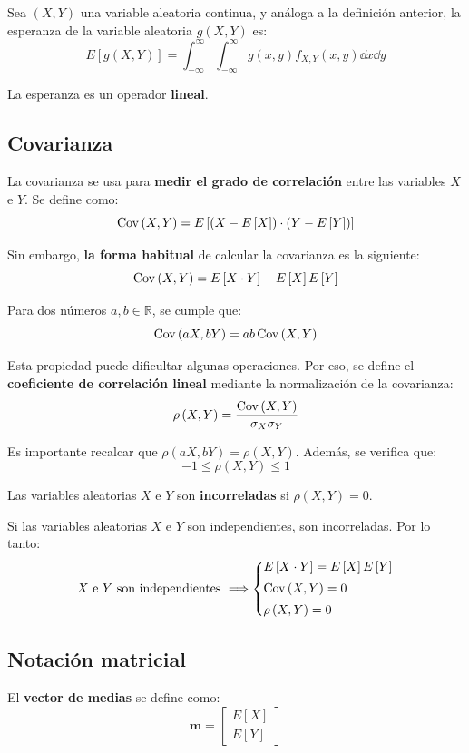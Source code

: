 \documentclass[a4paper]{book}
\renewcommand{\vec}[1]{\mathbf{#1}} %
\begin{document}
Sea $\left(X,Y\right)$ una variable aleatoria continua, y análoga a la definición anterior, la esperanza de la variable aleatoria $g\left(X,Y\right)$ es:
\[E\left[g\left(X,Y\right)\right] = \int_{-\infty}^{\infty}\int_{-\infty}^{\infty}g\left(x,y\right)f_{X,Y}(x,y)\dd{x} \dd{y}\]

La esperanza es un operador \textbf{lineal}.

\subsection{Covarianza}

La covarianza se usa para \textbf{medir el grado de correlación} entre las variables $X$ e $Y$. Se define como:
\[\operatorname{Cov} \left( X,Y \right) = E \left[\left(X-E\left[X\right]\right) \cdot \left(Y - E\left[Y\right]\right)\right]\]

Sin embargo, \textbf{la forma habitual} de calcular la covarianza es la siguiente:
\[\operatorname{Cov} \left( X,Y \right) = E\left[X\cdot Y\right] - E\left[X\right]E\left[Y\right]\]

Para dos números $a,b \in \mathbb{R}$, se cumple que:
\[\operatorname{Cov} \left( aX,bY \right) = ab\operatorname{Cov} \left( X,Y \right)\]

Esta propiedad puede dificultar algunas operaciones. Por eso, se define el \textbf{coeficiente de correlación lineal} mediante la normalización de la covarianza:
\[\rho \left(X,Y\right) = \frac{\operatorname{Cov} \left( X,Y \right)}{\sigma _X \sigma _Y} \]

Es importante recalcar que $\rho \left( aX,bY \right) = \rho \left( X,Y \right) $. Además, se verifica que:
\[-1\leq \rho \left( X,Y \right) \leq 1 \]

Las variables aleatorias $X$ e $Y$ son \textbf{incorreladas} si $\rho \left( X,Y \right)=0$.

Si las variables aleatorias $X$ e $Y$ son independientes, son incorreladas. Por lo tanto:
\[X \text{ e } Y \text{ son independientes} \ \Longrightarrow \left\lbrace \begin{matrix*}[l]
		E \left[ X \cdot Y \right] = E \left[ X \right] E \left[ Y \right] \\[5pt]
		\Cov \left( X,Y \right) = 0 \\[5pt]
		\rho \left( X,Y \right) = 0
	\end{matrix*} \right. \]

\subsection{Notación matricial}
El \textbf{vector de medias} se define como:
\[ \vec{m} = \left[
		\begin{matrix}
			E \left[ X \right] \\
			E \left[ Y \right]
		\end{matrix} \right] \]
\end{document}
